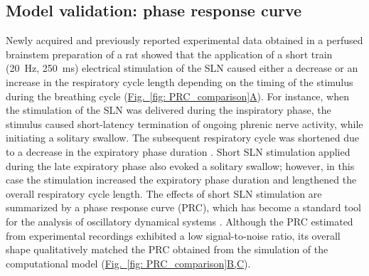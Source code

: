 \documentclass[pdflatex,sn-mathphys-ay]{sn-jnl}%
\renewcommand{\figureautorefname}{Fig.}
\newcommand{\Figref}[2][]{\hyperref[#2]{\figureautorefname~\ref*{#2}#1}}
\theoremstyle{thmstyleone}%
\theoremstyle{thmstyletwo}%
\theoremstyle{thmstylethree}%
\begin{document}
\subsection{Model validation: phase response curve}
Newly acquired and previously reported experimental data obtained in a perfused brainstem preparation of a rat \citep{paton1996working, paton2022advancing} showed that the application of a short train (20~Hz, 250~ms) electrical stimulation of the SLN caused either a decrease or an increase in the respiratory cycle length depending on the timing of the stimulus during the breathing cycle (\Figref[A]{fig: PRC_comparison}). For instance, when the stimulation of the SLN was delivered during the inspiratory phase, the stimulus caused short-latency termination of ongoing phrenic nerve activity, while initiating a solitary swallow. The subsequent respiratory cycle was shortened due to a decrease in the expiratory phase duration \citep{horton2018central, oku1992phase}. Short SLN stimulation applied during the late expiratory phase also evoked a solitary swallow; however, in this case the stimulation increased the expiratory phase duration and lengthened the overall respiratory cycle length. The effects of short SLN stimulation are summarized by a phase response curve (PRC), which has become a standard tool for the analysis of oscillatory dynamical systems \citep{galan2005efficient, izhikevich2007dynamical}. Although the PRC estimated from experimental recordings exhibited a low signal-to-noise ratio, its overall shape qualitatively matched the PRC obtained from the simulation of the computational model (\Figref[B,C]{fig: PRC_comparison}). 
\end{document}
